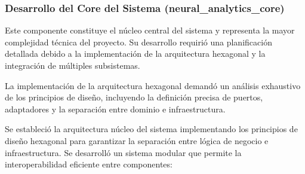 \newpage
\subsubsection{Desarrollo del Core del Sistema (neural\_analytics\_core)}

Este componente constituye el núcleo central del sistema y representa la mayor complejidad técnica del proyecto. Su desarrollo requirió una planificación detallada debido a la implementación de la arquitectura hexagonal y la integración de múltiples subsistemas.

La implementación de la arquitectura hexagonal demandó un análisis exhaustivo de los principios de diseño, incluyendo la definición precisa de puertos, adaptadores y la separación entre dominio e infraestructura.

Se estableció la arquitectura núcleo del sistema implementando los principios de diseño hexagonal para garantizar la separación entre lógica de negocio e infraestructura. Se desarrolló un sistema modular que permite la interoperabilidad eficiente entre componentes:

